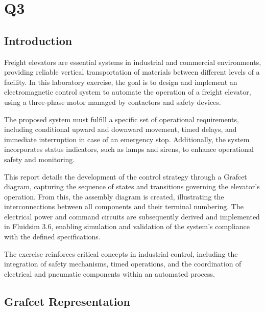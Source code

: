 \section{Q3} 

\subsection{Introduction} \label{sec:Introduction}

Freight elevators are essential systems in industrial and commercial environments, providing reliable 
vertical transportation of materials between different levels of a facility. In this laboratory exercise, 
the goal is to design and implement an electromagnetic control system to automate the operation of a freight 
elevator, using a three-phase motor managed by contactors and safety devices.

The proposed system must fulfill a specific set of operational requirements, including conditional 
upward and downward movement, timed delays, and immediate interruption in case of an emergency stop. 
Additionally, the system incorporates status indicators, such as lamps and sirens, to enhance operational 
safety and monitoring.

This report details the development of the control strategy through a Grafcet diagram, capturing the 
sequence of states and transitions governing the elevator’s operation. From this, the assembly diagram 
is created, illustrating the interconnections between all components and their terminal numbering. The 
electrical power and command circuits are subsequently derived and implemented in Fluidsim 3.6, enabling 
simulation and validation of the system’s compliance with the defined specifications.

The exercise reinforces critical concepts in industrial control, including the integration of safety 
mechanisms, timed operations, and the coordination of electrical and pneumatic components within an 
automated process.

\subsection{Grafcet Representation} \label{sec:Grafcet_Representation}

